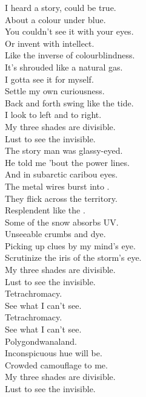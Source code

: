

I heard a story, could be true. \\
About a colour under blue. \\
You couldn't see it with your eyes. \\
Or invent with intellect. \\

Like the inverse of colourblindness. \\
It's shrouded like a natural gas. \\
I gotta see it for myself. \\
Settle my own curiousness. \\

Back and forth swing like the tide. \\
I look to left and to right. \\
My three shades are divisible. \\
Lust to see the invisible. \\

The story man was glassy-eyed. \\
He told me 'bout the power lines. \\
And in subarctic caribou eyes. \\
The metal wires burst into . \\

They flick across the territory. \\
Resplendent like the . \\
Some of the snow absorbs UV. \\
Unseeable crumbs and dye. \\

Picking up clues by my mind's eye. \\
Scrutinize the iris of the storm's eye. \\
My three shades are divisible. \\
Lust to see the invisible. \\

Tetrachromacy. \\
See what I can't see. \\
Tetrachromacy. \\
See what I can't see. \\

Polygondwanaland. \\

Inconspicuous hue will be. \\
Crowded camouflage to me. \\
My three shades are divisible. \\
Lust to see the invisible. \\

